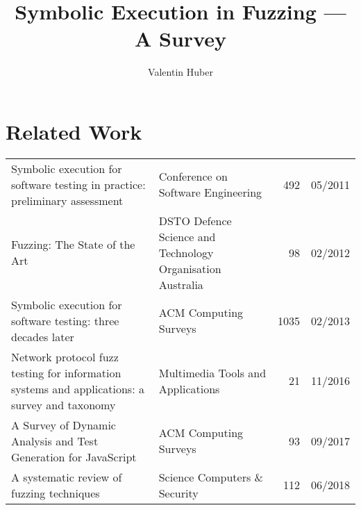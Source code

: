\documentclass{article}
\title{Symbolic Execution in Fuzzing — A Survey}
\author{Valentin Huber}
\begin{document}


\maketitle
\tableofcontents
\pagebreak

\section{Related Work}
\begin{longtable}{|P{0.44\textwidth}|P{0.32\textwidth}|r|r|}
    \hline
                                                                                                                            &                                              &  &  \\\hline
    \endhead
    Symbolic execution for software testing in practice: preliminary assessment\cite{PreliminaryAssessment}                                       & Conference on Software Engineering                         & 492            & 05/2011       \\\hline
    Fuzzing: The State of the Art\cite{FuzzingTheStateOfTheArt}                                                                                   & DSTO Defence Science and Technology Organisation Australia & 98             & 02/2012       \\\hline
    Symbolic execution for software testing: three decades later\cite{ReviewThreeDecades}                                                         & ACM Computing Surveys                                      & 1035           & 02/2013       \\\hline
    Network protocol fuzz testing for information systems and applications: a survey and taxonomy\cite{Network}                                   & Multimedia Tools and Applications                          & 21             & 11/2016       \\\hline
    A Survey of Dynamic Analysis and Test Generation for JavaScript                                                                               & ACM Computing Surveys                                      & 93             & 09/2017       \\\hline
    A systematic review of fuzzing techniques\cite{Science}                                                                                       & Science Computers \& Security                              & 112            & 06/2018       \\\hline

\end{longtable}
\end{document}
